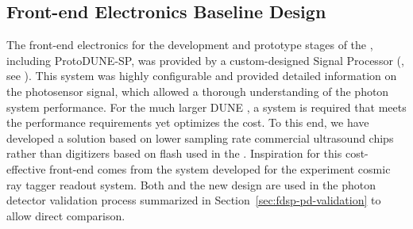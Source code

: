 




\subsection{Front-end Electronics Baseline Design}
\label{sec:electronics}

The front-end electronics for the development and prototype stages of the  , including ProtoDUNE-SP, was provided by a custom-designed  Signal Processor (, see ). This system was highly configurable and provided detailed information on the photosensor signal, which allowed a thorough understanding of the photon system performance.
For the much larger DUNE , a system is required that meets the performance requirements yet optimizes the cost.
To this end, we have developed a solution based on lower sampling rate commercial ultrasound  chips rather than digitizers based on flash  used in the . Inspiration for this cost-effective front-end comes from the system developed for the  experiment cosmic ray tagger readout system.
Both  and the new design are used in the photon detector validation process summarized in Section~\ref{sec:fdsp-pd-validation} to allow direct comparison.

